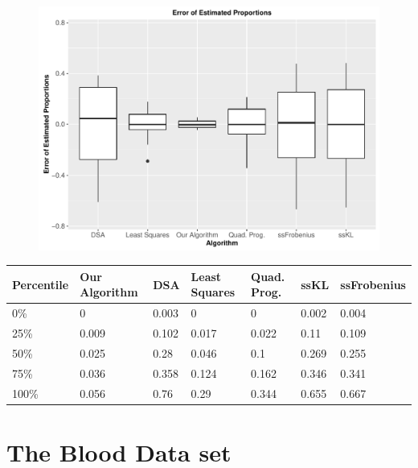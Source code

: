 \documentclass[reqno,12pt,oneside]{report}\usepackage[]{graphicx}\usepackage[]{color}
\makeatletter
\def\maxwidth{ %
  \ifdim\Gin@nat@width>\linewidth
    \linewidth
  \else
    \Gin@nat@width
  \fi
}
\newenvironment{knitrout}{}{} %
\renewenvironment{knitrout}{\begin{small}}{\end{small}}
\theoremstyle{plain}
\theoremstyle{definition}
\theoremstyle{remark}
\numberwithin{theorem}{chapter}     %
\makeatother
\begin{document}
\begin{figure}
  \centering
\begin{knitrout}
\color{fgcolor}
\includegraphics[width=\maxwidth]{figure/plot2-1} 

\end{knitrout}
\end{figure}

\begin{table}[ht]
\centering
\begin{tabular}{lllllll}
  \hline
Percentile & Our Algorithm & DSA & Least Squares & Quad. Prog. & ssKL & ssFrobenius \\ 
  \hline
0\% & 0 & 0.003 & 0 & 0 & 0.002 & 0.004 \\ 
  25\% & 0.009 & 0.102 & 0.017 & 0.022 & 0.11 & 0.109 \\ 
  50\% & 0.025 & 0.28 & 0.046 & 0.1 & 0.269 & 0.255 \\ 
  75\% & 0.036 & 0.358 & 0.124 & 0.162 & 0.346 & 0.341 \\ 
  100\% & 0.056 & 0.76 & 0.29 & 0.344 & 0.655 & 0.667 \\ 
   \hline
\end{tabular}
\end{table}


\section{The Blood Data set}
\end{document}
